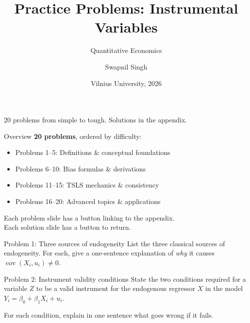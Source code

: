 \documentclass[10pt]{beamer}
\title{Practice Problems: Instrumental Variables}
\subtitle{Quantitative Economics}
\author{Swapnil Singh}
\institute{Lietuvos Bankas \and Kaunas University of Technology}
\date{Vilnius University, 2026}
\begin{document}
\begin{frame}[plain]
  \titlepage
  \vfill
  {\scriptsize\color{gray} 20 problems from simple to tough. Solutions in the appendix.}
\end{frame}

\begin{frame}{Overview}
\textbf{20 problems}, ordered by difficulty:
\begin{itemize}
  \item Problems 1--5: Definitions \& conceptual foundations
  \item Problems 6--10: Bias formulas \& derivations
  \item Problems 11--15: TSLS mechanics \& consistency
  \item Problems 16--20: Advanced topics \& applications
\end{itemize}

\vspace{1em}
Each problem slide has a  button linking to the appendix.\\
Each solution slide has a  button to return.
\end{frame}


\begin{frame}{Problem 1: Three sources of endogeneity}
\label{q1}
List the three classical sources of endogeneity. For each, give a one-sentence explanation of \emph{why} it causes $\operatorname{cov}(X_i, u_i) \neq 0$.

\vfill
\hfill\hyperlink{s1}{}
\end{frame}

\begin{frame}{Problem 2: Instrument validity conditions}
\label{q2}
State the two conditions required for a variable $Z$ to be a valid instrument for the endogenous regressor $X$ in the model $Y_i = \beta_0 + \beta_1 X_i + u_i$.

For each condition, explain in one sentence what goes wrong if it fails.

\vfill
\hfill\hyperlink{s2}{}
\end{frame}
\end{document}
